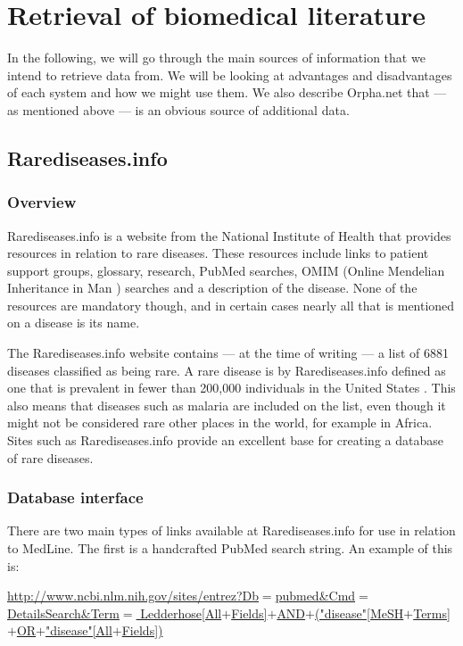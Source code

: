 \section{Retrieval of biomedical literature}

In the following, we will go through the main sources of information
that we intend to retrieve data from. We will be looking at advantages
and disadvantages of each system and how we might use them. We also
describe Orpha.net that --- as mentioned above --- is an obvious source of
additional data.

\subsection{Rarediseases.info\label{Rarediseases_info}}

\subsubsection{Overview}
Rarediseases.info is a website from the National Institute of Health
\cite{NIHOverview} that provides resources in relation to rare
diseases. These resources include links to patient support groups,
glossary, research, PubMed searches, OMIM (Online Mendelian
Inheritance in Man \cite{OMIM} )
searches and a description of the disease. None of the resources are
mandatory though, and in certain cases nearly all that is mentioned on
a disease is its name.

The Rarediseases.info website contains --- at the time of writing --- a list
of 6881 diseases classified as being rare. A rare disease is by
Rarediseases.info defined as one that is prevalent in fewer than
200,000 individuals in the United States \cite{RareDiseaseDef}. This
also means that diseases such as malaria are included on the list,
even though it might not be considered rare other places in the world,
for example in Africa. Sites such as Rarediseases.info provide an excellent
base for creating a database of rare diseases.

\subsubsection{Database interface}
There are two main types of links available at Rarediseases.info for
use in relation to MedLine. The first is a handcrafted PubMed search
string. An example of this is:

{\small
\href{http://www.ncbi.nlm.nih.gov/sites/entrez?Db=pubmed&Cmd=DetailsSearch&Term=Ledderhose[All+Fields]+AND+("disease"[MeSH+Terms]+OR+"disease"[All+Fields])}{http://www.ncbi.nlm.nih.gov/sites/entrez?Db$=$pubmed\&Cmd$=$DetailsSearch\&Term$=$ Ledderhose[All$+$Fields]$+$AND$+$("disease"[MeSH$+$Terms]$+$OR$+$"disease"[All$+$Fields])} \\
}

